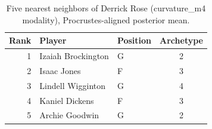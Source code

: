 \begin{table}[htbp]
  \centering\small
  \begin{tabular}{rllc}
    \toprule
    Rank & Player & Position & Archetype \\
    \midrule
    1 & Izaiah Brockington & G & 2 \\
    2 & Isaac Jones & F & 3 \\
    3 & Lindell Wigginton & G & 4 \\
    4 & Kaniel Dickens & F & 3 \\
    5 & Archie Goodwin & G & 2 \\
    \bottomrule
  \end{tabular}
  \caption{Five nearest neighbors of Derrick Rose (curvature_m4 modality), Procrustes-aligned posterior mean.}
  \label{tab:Derrick_Rose_neighbors_curvature_m4}
\end{table}

